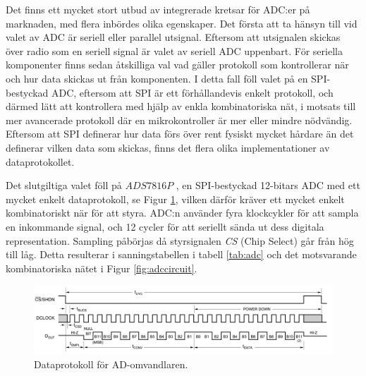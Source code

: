 \documentclass[a4paper,10pt]{article}
\begin{document}
Det finns ett mycket stort utbud av integrerade kretsar för ADC:er på marknaden,
med flera inbördes olika egenskaper. Det första att ta hänsyn till vid valet av
ADC är seriell eller parallel utsignal. Eftersom att utsignalen skickas över 
radio som en seriell signal är valet av seriell ADC uppenbart. För seriella 
komponenter finns sedan åtskilliga val vad gäller protokoll som kontrollerar när
och hur data skickas ut från komponenten. I detta fall föll valet på en 
SPI-bestyckad ADC, eftersom att SPI är ett förhållandevis enkelt protokoll, och
därmed lätt att kontrollera med hjälp av enkla kombinatoriska nät, i motsats 
till mer avancerade protokoll där en mikrokontroller är mer eller mindre
nödvändig. Eftersom att SPI definerar hur data förs över rent fysiskt mycket
hårdare än det definerar vilken data som skickas, finns det flera olika 
implementationer av dataprotokollet.

Det slutgiltiga valet föll på $ADS7816P$ \cite{adc}, en SPI-bestyckad 12-bitars 
ADC med ett mycket enkelt dataprotokoll, se Figur \ref{fig:adcproto}, vilken 
därför kräver ett mycket enkelt kombinatoriskt när för att styra. ADC:n använder 
fyra klockcykler för att sampla en inkommande signal, och 12 cycler för att
seriellt sända ut dess digitala representation. Sampling påbörjas då 
styrsignalen \emph{CS} (Chip Select) går från hög till låg. Detta resulterar i 
sanningstabellen i tabell \ref{tab:adc} och det motsvarande kombinatoriska nätet 
i Figur \ref{fig:adccircuit}.

\begin{figure}
\centering
\includegraphics[width=\textwidth]{adcdiagram.png}
\caption{Dataprotokoll för AD-omvandlaren.}
\label{fig:adcproto}
\end{figure}
\end{document}
